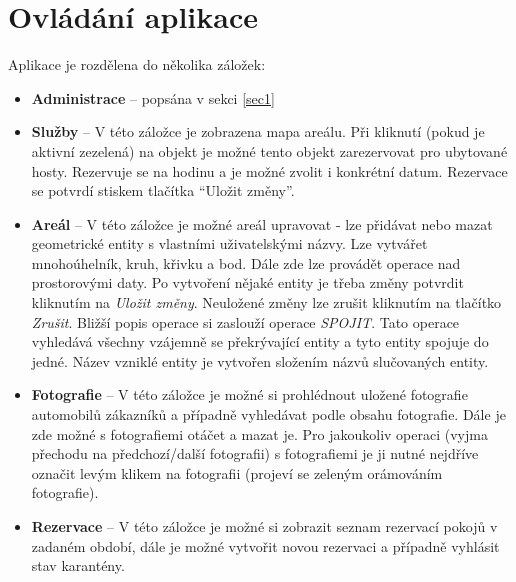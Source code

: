 \documentclass[11pt,a4paper]{article}
\newcommand\mycomment[1]{}
\begin{document}
\section{Ovládání aplikace}
Aplikace je rozdělena do několika záložek: 
\begin{itemize}
\item \textbf{Administrace} -- popsána v sekci \ref{sec1}
\item \textbf{Služby} -- V této záložce je zobrazena mapa areálu. Při kliknutí (pokud je aktivní zezelená) na objekt je možné tento objekt zarezervovat pro ubytované hosty. Rezervuje se na hodinu a je možné zvolit i konkrétní datum. Rezervace se potvrdí stiskem tlačítka ``Uložit změny''.

\item \textbf{Areál} -- V této záložce je možné areál upravovat - lze přidávat nebo mazat geometrické entity s vlastními uživatelskými názvy. Lze vytvářet mnohoúhelník, kruh, křivku a bod. Dále zde lze provádět operace nad prostorovými daty. Po vytvoření nějaké entity je třeba změny potvrdit kliknutím na {\em Uložit změny}. Neuložené změny lze zrušit kliknutím na tlačítko {\em Zrušit}. Bližší popis operace si zaslouží operace {\em SPOJIT}. Tato operace vyhledává všechny vzájemně se překrývající entity a tyto entity spojuje do jedné. Název vzniklé entity je vytvořen složením názvů slučovaných entity.


\item \textbf{Fotografie} -- V této záložce je možné si prohlédnout uložené fotografie automobilů zákazníků a případně vyhledávat podle obsahu fotografie. Dále je zde možné s fotografiemi otáčet a mazat je. Pro jakoukoliv operaci (vyjma přechodu na předchozí/další fotografii) s fotografiemi je ji nutné nejdříve označit levým klikem na fotografii (projeví se zeleným orámováním fotografie).
\item \textbf{Rezervace} -- V této záložce je možné si zobrazit seznam rezervací pokojů v zadaném období, dále je možné vytvořit novou rezervaci a případně vyhlásit stav karantény.
\end{itemize}
\mycomment{\begin{figure}[h!]
\begin{center}
\scalebox{0.5}{\texttt{[image: images/sluzby.png]}}
\caption{Obrazovka služeb.}
\label{sluzby}
\end{center}
\end{figure}}
\mycomment{\begin{figure}[h!]
\begin{center}
\scalebox{0.6}{\texttt{[image: images/fotografie.png]}}
\caption{Obrazovka fotografií.}
\label{foto}
\end{center}
\end{figure}}
\end{document}
